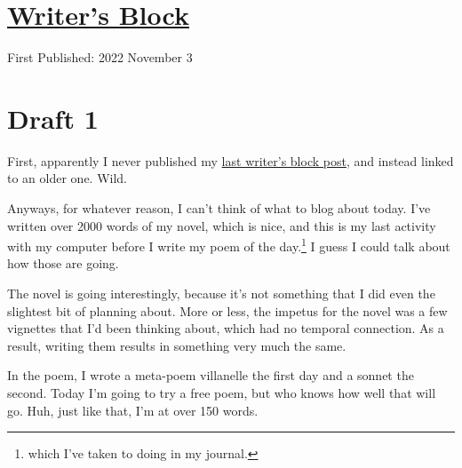\documentclass[12pt]{article}[titlepage]
\newcommand{\1}{\={a}}
\newcommand{\2}{\={e}}
\newcommand{\3}{\={\i}}
\newcommand{\4}{\=o}
\newcommand{\5}{\=u}
\newcommand{\6}{\={A}}
\renewcommand{\,}{\textsuperscript{,}}
\begin{document}
\doublespacing
\section{\href{writers-block-5.tex}{Writer's Block}}
First Published: 2022 November 3
\section{Draft 1}
First, apparently I never published my \href{writers-block-4.html}{last writer's block post}, and instead linked to an older one.
Wild.

Anyways, for whatever reason, I can't think of what to blog about today.
I've written over 2000 words of my novel, which is nice, and this is my last activity with my computer before I write my poem of the day.\footnote{which I've taken to doing in my journal.}
I guess I could talk about how those are going.

The novel is going interestingly, because it's not something that I did even the slightest bit of planning about.
More or less, the impetus for the novel was a few vignettes that I'd been thinking about, which had no temporal connection.
As a result, writing them results in something very much the same.

In the poem, I wrote a meta-poem villanelle the first day and a sonnet the second.
Today I'm going to try a free poem, but who knows how well that will go.
Huh, just like that, I'm at over 150 words.
\end{document}
